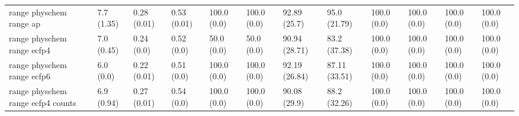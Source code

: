 \begin{tabular}{llllllllllll}
range physchem range ap & {\cellcolor[HTML]{F6FCFD}} \color[HTML]{000000} 7.7 (1.35) & {\cellcolor[HTML]{F7FCFD}} \color[HTML]{000000} 0.28 (0.01) & {\cellcolor[HTML]{5EBE9B}} \color[HTML]{000000} 0.53 (0.01) & {\cellcolor[HTML]{00441B}} \color[HTML]{F1F1F1} 100.0 (0.0) & {\cellcolor[HTML]{00441B}} \color[HTML]{F1F1F1} 100.0 (0.0) & {\cellcolor[HTML]{005B25}} \color[HTML]{F1F1F1} 92.89 (25.7) & {\cellcolor[HTML]{005321}} \color[HTML]{F1F1F1} 95.0 (21.79) & {\cellcolor[HTML]{00441B}} \color[HTML]{F1F1F1} 100.0 (0.0) & {\cellcolor[HTML]{00441B}} \color[HTML]{F1F1F1} 100.0 (0.0) & {\cellcolor[HTML]{00441B}} \color[HTML]{F1F1F1} 100.0 (0.0) & {\cellcolor[HTML]{00441B}} \color[HTML]{F1F1F1} 100.0 (0.0) \\
range physchem range ecfp4 & {\cellcolor[HTML]{EFF9FB}} \color[HTML]{000000} 7.0 (0.45) & {\cellcolor[HTML]{F7FCFD}} \color[HTML]{000000} 0.24 (0.0) & {\cellcolor[HTML]{61BF9E}} \color[HTML]{000000} 0.52 (0.0) & {\cellcolor[HTML]{65C2A3}} \color[HTML]{000000} 50.0 (0.0) & {\cellcolor[HTML]{65C2A3}} \color[HTML]{000000} 50.0 (0.0) & {\cellcolor[HTML]{006227}} \color[HTML]{F1F1F1} 90.94 (28.71) & {\cellcolor[HTML]{0B7734}} \color[HTML]{F1F1F1} 83.2 (37.38) & {\cellcolor[HTML]{00441B}} \color[HTML]{F1F1F1} 100.0 (0.0) & {\cellcolor[HTML]{00441B}} \color[HTML]{F1F1F1} 100.0 (0.0) & {\cellcolor[HTML]{00441B}} \color[HTML]{F1F1F1} 100.0 (0.0) & {\cellcolor[HTML]{00441B}} \color[HTML]{F1F1F1} 100.0 (0.0) \\
range physchem range ecfp6 & {\cellcolor[HTML]{F6FCFD}} \color[HTML]{000000} 6.0 (0.0) & {\cellcolor[HTML]{F6FCFD}} \color[HTML]{000000} 0.22 (0.01) & {\cellcolor[HTML]{62C09F}} \color[HTML]{000000} 0.51 (0.0) & {\cellcolor[HTML]{00441B}} \color[HTML]{F1F1F1} 100.0 (0.0) & {\cellcolor[HTML]{00441B}} \color[HTML]{F1F1F1} 100.0 (0.0) & {\cellcolor[HTML]{005C25}} \color[HTML]{F1F1F1} 92.19 (26.84) & {\cellcolor[HTML]{006D2C}} \color[HTML]{F1F1F1} 87.11 (33.51) & {\cellcolor[HTML]{00441B}} \color[HTML]{F1F1F1} 100.0 (0.0) & {\cellcolor[HTML]{00441B}} \color[HTML]{F1F1F1} 100.0 (0.0) & {\cellcolor[HTML]{00441B}} \color[HTML]{F1F1F1} 100.0 (0.0) & {\cellcolor[HTML]{00441B}} \color[HTML]{F1F1F1} 100.0 (0.0) \\
range physchem range ecfp4 counts & {\cellcolor[HTML]{EDF8FB}} \color[HTML]{000000} 6.9 (0.94) & {\cellcolor[HTML]{F7FCFD}} \color[HTML]{000000} 0.27 (0.01) & {\cellcolor[HTML]{5ABB95}} \color[HTML]{F1F1F1} 0.54 (0.0) & {\cellcolor[HTML]{00441B}} \color[HTML]{F1F1F1} 100.0 (0.0) & {\cellcolor[HTML]{00441B}} \color[HTML]{F1F1F1} 100.0 (0.0) & {\cellcolor[HTML]{006428}} \color[HTML]{F1F1F1} 90.08 (29.9) & {\cellcolor[HTML]{006B2B}} \color[HTML]{F1F1F1} 88.2 (32.26) & {\cellcolor[HTML]{00441B}} \color[HTML]{F1F1F1} 100.0 (0.0) & {\cellcolor[HTML]{00441B}} \color[HTML]{F1F1F1} 100.0 (0.0) & {\cellcolor[HTML]{00441B}} \color[HTML]{F1F1F1} 100.0 (0.0) & {\cellcolor[HTML]{00441B}} \color[HTML]{F1F1F1} 100.0 (0.0) \\

\end{tabular}
